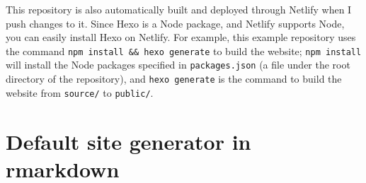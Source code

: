 \documentclass[12pt,]{krantz}
\makeatletter
\newenvironment{Shaded}{\begin{snugshade}}{\end{snugshade}}
\newcommand{\KeywordTok}[1]{\textcolor[rgb]{0.13,0.29,0.53}{\textbf{#1}}}
\newcommand{\DataTypeTok}[1]{\textcolor[rgb]{0.13,0.29,0.53}{#1}}
\newcommand{\DecValTok}[1]{\textcolor[rgb]{0.00,0.00,0.81}{#1}}
\newcommand{\StringTok}[1]{\textcolor[rgb]{0.31,0.60,0.02}{#1}}
\newcommand{\CommentTok}[1]{\textcolor[rgb]{0.56,0.35,0.01}{\textit{#1}}}
\newcommand{\OtherTok}[1]{\textcolor[rgb]{0.56,0.35,0.01}{#1}}
\newcommand{\OperatorTok}[1]{\textcolor[rgb]{0.81,0.36,0.00}{\textbf{#1}}}
\newcommand{\NormalTok}[1]{#1}
\newenvironment{kframe}{%
\medskip{}
\setlength{\fboxsep}{.8em}
 \def\at@end@of@kframe{}%
 \ifinner\ifhmode%
  \def\at@end@of@kframe{\end{minipage}}%
  \begin{minipage}{\columnwidth}%
 \fi\fi%
 \def\FrameCommand##1{\hskip\@totalleftmargin \hskip-\fboxsep
 \colorbox{shadecolor}{##1}\hskip-\fboxsep
     \hskip-\linewidth \hskip-\@totalleftmargin \hskip\columnwidth}%
 \MakeFramed {\advance\hsize-\width
   \@totalleftmargin\z@ \linewidth\hsize
   \@setminipage}}%
 {\par\unskip\endMakeFramed%
 \at@end@of@kframe}
\renewenvironment{Shaded}{\begin{kframe}}{\end{kframe}}
\theoremstyle{definition}
\theoremstyle{definition}
\theoremstyle{definition}
\theoremstyle{remark}
\makeatother
\begin{document}
\begin{Shaded}
\end{Shaded}

This repository is also automatically built and deployed through
Netlify when I push changes to it. Since Hexo is a Node
package, and Netlify supports Node, you can easily install Hexo on
Netlify. For example, this example repository uses the command
\texttt{npm\ install\ \&\&\ hexo\ generate} to build the website;
\texttt{npm\ install} will install the Node packages specified in
\texttt{packages.json} (a file under the root directory of the
repository), and \texttt{hexo\ generate} is the command to build the
website from \texttt{source/} to \texttt{public/}.

\section{Default site generator in rmarkdown}\label{rmd-website}
\end{document}
